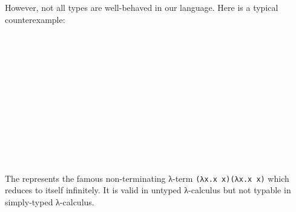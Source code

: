 However, not all types are well-behaved in our language. Here is a typical counterexample:

\begin{code}%
\>[0]\AgdaSymbol{\{-\#}\AgdaSpace{}%
\AgdaSpace{}%
\AgdaSymbol{\#-\}}\<%
\\
\>[0]\AgdaSpace{}%
\AgdaSpace{}%
\AgdaSymbol{:}\AgdaSpace{}%
\AgdaSpace{}%
\<%
\\
\>[0][@{}l@{\AgdaIndent{0}}]%
\>[2]\AgdaSpace{}%
\AgdaSymbol{:}\AgdaSpace{}%
\AgdaSymbol{(}\AgdaSpace{}%
\AgdaSpace{}%
\AgdaSymbol{)}\AgdaSpace{}%
\AgdaSpace{}%
\<%
\\
%
\\[\AgdaEmptyExtraSkip]%
\>[0]\AgdaSpace{}%
\AgdaSymbol{:}\AgdaSpace{}%
\AgdaSpace{}%
\AgdaSpace{}%
\AgdaSpace{}%
\AgdaSpace{}%
\<%
\\
\>[0]\AgdaSpace{}%
\AgdaSymbol{(}\AgdaSpace{}%
\AgdaSymbol{)}\AgdaSpace{}%
\AgdaSpace{}%
\AgdaSymbol{=}\AgdaSpace{}%
\AgdaSpace{}%
\<%
\\
%
\\[\AgdaEmptyExtraSkip]%
\>[0]\AgdaSpace{}%
\AgdaSymbol{:}\AgdaSpace{}%
\<%
\\
\>[0]\AgdaSpace{}%
\AgdaSymbol{=}\AgdaSpace{}%
\AgdaSpace{}%
\AgdaSpace{}%
\AgdaSpace{}%
\AgdaSpace{}%
\AgdaSpace{}%
\AgdaSpace{}%
\AgdaSymbol{)}\<%
\\
%
\\[\AgdaEmptyExtraSkip]%
\>[0]\AgdaSpace{}%
\AgdaSymbol{:}\AgdaSpace{}%
\<%
\\
\>[0]\AgdaSpace{}%
\AgdaSymbol{=}\AgdaSpace{}%
\AgdaSpace{}%
\AgdaSpace{}%
\<%
\end{code}

The  represents the famous non-terminating λ-term \texttt{(λx.x x)(λx.x x)} which reduces to itself infinitely. It is valid in untyped λ-calculus but not typable in simply-typed λ-calculus. 

